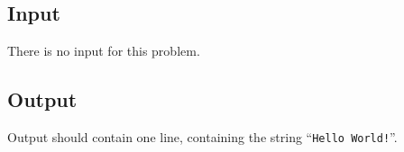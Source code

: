 
\subsection*{Input}

There is no input for this problem.

\subsection*{Output}

Output should contain one line, containing the string ``{\tt Hello World!}''.

